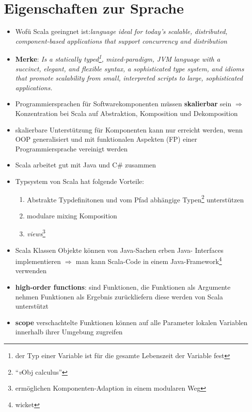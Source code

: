 \section{Eigenschaften zur Sprache}
\begin{itemize}
  \item Wofü Scala geeingnet ist:\textit{language ideal for today’s scalable,
  distributed, component-based applications that support concurrency and
  distribution}
  \item \textbf{Merke}: \textit{Is a statically typed\footnote{der Typ 
  einer Variable ist für die gesamte Lebenszeit der Variable fest}, 
  mixed-paradigm, JVM language with a succinct, elegant, and flexible 
  syntax, a sophisticated type system, and idioms that promote 
  scalability from small, interpreted scripts to large, 
  sophisticated applications.}
  \item Programmiersprachen für Softwarekomponenten müssen \textbf{skalierbar}
  sein $\Rightarrow$ Konzentration bei Scala auf Abstraktion, Komposition
  und Dekomposition
  \item skalierbare Unterstützung für Komponenten kann nur erreicht werden,
  wenn OOP generalisiert und mit funktionalen Aspekten (FP) einer
  Programmiersprache vereinigt werden
  \item Scala arbeitet gut mit Java und C\# zusammen
  \item Typsystem von Scala hat folgende Vorteile:
  \begin{enumerate}
    \item Abstrakte Typdefinitonen und vom Pfad 
    abhängige Typen\footnote{\enquote{\textit{v}Obj calculus}} unterstützen
    \item modulare mixing Komposition
    \item \textit{views}\footnote{ermöglichen Komponenten-Adaption in 
    einem modularen Weg}
  \end{enumerate}
  \item Scala Klassen \und Objekte können von Java-Sachen erben \und Java-
  Interfaces implementieren $\Rightarrow$ man kann Scala-Code in einem 
  Java-Framework\footnote{wicket} verwenden
  \item \textbf{high-order functions}: sind Funktionen, die Funktionen als
  Argumente nehmen \oder Funktionen als Ergebnis zurückliefern \und diese
  werden von Scala unterstützt
  \item \textbf{scope} verschachtelte Funktionen können auf alle Parameter 
  \und lokalen Variablen innerhalb ihrer Umgebung zugreifen

\end{itemize}
